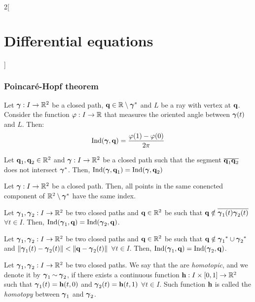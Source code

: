\documentclass[../../../main.tex]{subfiles}
\begin{document}
\begin{multicols}{2}[\section{Differential equations}]
  \subsubsection{Poincaré-Hopf theorem}
  \begin{proposition}
    Let $\vf\gamma:I\rightarrow\RR^2$ be a closed path, $\vf{q}\in \RR\setminus\vf\gamma^*$ and $L$ be a ray with vertex at $\vf{q}$. Consider the function $\varphi:I\rightarrow\RR$ that measures the oriented angle between $\vf\gamma(t)$ and $L$. Then: $$\Ind(\vf\gamma,\vf{q})=\frac{\varphi(1)-\varphi(0)}{2\pi}$$
  \end{proposition}
  \begin{proposition}
    Let $\vf{q}_1,\vf{q}_2\in\RR^2$ and $\vf\gamma:I\rightarrow\RR^2$ be a closed path such that the segment $\overline{\vf{q}_1\vf{q}_2}$ does not intersect $\vf\gamma^*$. Then, $\Ind(\vf\gamma,\vf{q}_1)=\Ind(\vf\gamma,\vf{q}_2)$
  \end{proposition}
  \begin{corollary}
    Let $\vf\gamma:I\rightarrow\RR^2$ be a closed path. Then, all points in the same conencted component of $\RR^2\setminus\vf\gamma^*$ have the same index.
  \end{corollary}
  \begin{proposition}
    Let $\vf\gamma_1,\vf\gamma_2:I\rightarrow\RR^2$ be two closed paths and $\vf{q}\in\RR^2$ be such that $\vf{q}\notin\overline{\vf\gamma_1(t)\vf\gamma_2(t)}$ $\forall t\in I$. Then, $\Ind(\vf\gamma_1,\vf{q})=\Ind(\vf\gamma_2,\vf{q})$.
  \end{proposition}
  \begin{proposition}
    Let $\vf\gamma_1,\vf\gamma_2:I\rightarrow\RR^2$ be two closed paths and $\vf{q}\in\RR^2$ be such that $\vf{q}\notin{\vf\gamma_1}^*\cup{\vf\gamma_2}^*$ and $\|\vf\gamma_1(t)-\vf\gamma_2(t)\|<\|\vf{q}-\vf\gamma_2(t)\|$ $\forall t\in I$. Then, $\Ind(\vf\gamma_1,\vf{q})=\Ind(\vf\gamma_2,\vf{q})$.
  \end{proposition}
  \begin{definition}
    Let $\vf\gamma_1,\vf\gamma_2:I\rightarrow\RR^2$ be two closed paths. We say that the are \emph{homotopic}, and we denote it by $\vf\gamma_1\homotop\vf\gamma_2$, if there exists a continuous function $\vf{h}:I\times[0,1]\rightarrow\RR^2$ such that $\vf\gamma_1(t)=\vf{h}(t,0)$ and $\vf\gamma_2(t)=\vf{h}(t,1)$ $\forall t\in I$. Such function $\vf{h}$ is called the \emph{homotopy} between $\vf\gamma_1$ and $\vf\gamma_2$.
  \end{definition}
  \begin{proposition}

\end{proposition}
\end{multicols}
\end{document}
